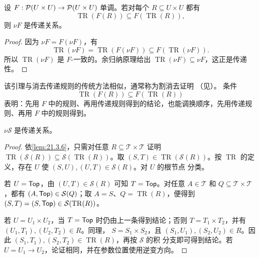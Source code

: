 \begin{lemma}
\label{lem:21.3.6}
设 \(F:\mathcal{P}(U\times U)\to\mathcal{P}(U\times U)\) 单调。若对每个
\(R\subseteq U\times U\) 都有
\[
\operatorname{TR}(F(R))\subseteq F(\operatorname{TR}(R)),
\]
则 \(\nu F\) 是传递关系。
\end{lemma}

\begin{proof}
因为 \(\nu F=F(\nu F)\)，有
\[
\operatorname{TR}(\nu F)=\operatorname{TR}(F(\nu F))
\subseteq F(\operatorname{TR}(\nu F)).
\]
所以 \(\operatorname{TR}(\nu F)\) 是 \(F\)-一致的。余归纳原理给出
\(\operatorname{TR}(\nu F)\subseteq\nu F\)，这正是传递性。
\end{proof}

该引理与消去传递规则的传统方法相似，通常称为割消去证明
（见）。
条件
\[
\operatorname{TR}(F(R))\subseteq F(\operatorname{TR}(R))
\]
表明：先用
\(F\) 中的规则、再用传递规则得到的结论，也能调换顺序，先用传递规则、再用
\(F\) 中的规则得到。


\begin{theorem}
\label{thm:21.3.7}
\(\nu\mathcal S\) 是传递关系。
\end{theorem}

\begin{proof}
依\cref{lem:21.3.6}，只需对任意 \(R\subseteq\mathcal T\times\mathcal T\)
证明
\(\operatorname{TR}(\mathcal S(R))\subseteq
\mathcal S(\operatorname{TR}(R))\)。取
\((S,T)\in\operatorname{TR}(\mathcal S(R))\)。按 \(\operatorname{TR}\)
的定义，存在 \(U\) 使 \((S,U),(U,T)\in\mathcal S(R)\)。对 \(U\) 的根节点
分类。

若 \(U=\mathsf{Top}\)，由 \((U,T)\in\mathcal S(R)\) 可知
\(T=\mathsf{Top}\)。对任意 \(A\in\mathcal T\) 和
\(Q\subseteq\mathcal T\times\mathcal T\)，都有
\((A,\mathsf{Top})\in\mathcal S(Q)\)；取
\(A=S\)、\(Q=\operatorname{TR}(R)\)，便得到
\((S,T)=(S,\mathsf{Top})\in\mathcal S(\operatorname{TR}(R))\)。

若 \(U=U_1\times U_2\)，当 \(T=\mathsf{Top}\) 时仍由上一条得到结论；否则
\(T=T_1\times T_2\)，并有 \((U_1,T_1),(U_2,T_2)\in R\)。同理，
\(S=S_1\times S_2\)，且 \((S_1,U_1),(S_2,U_2)\in R\)。因此
\((S_1,T_1),(S_2,T_2)\in\operatorname{TR}(R)\)，再按 \(\mathcal S\) 的积
分支即可得到结论。若 \(U=U_1\to U_2\)，论证相同，并在参数位置使用逆变方向。
\end{proof}

